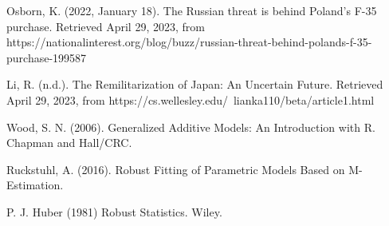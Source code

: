 \documentclass[11pt,regno]{amsart}
\theoremstyle{plain}
\numberwithin{equation}{section}
\begin{document}
\begin{thebibliography}{9}
Osborn, K. (2022, January 18). The Russian threat is behind Poland's F-35 purchase. Retrieved April 29, 2023, from https://nationalinterest.org/blog/buzz/russian-threat-behind-polands-f-35-purchase-199587

Li, R. (n.d.). The Remilitarization of Japan: An Uncertain Future. Retrieved April 29, 2023, from https://cs.wellesley.edu/~lianka110/beta/article1.html

Wood, S. N. (2006). Generalized Additive Models: An Introduction with R. Chapman and Hall/CRC.

Ruckstuhl, A. (2016). Robust Fitting of Parametric Models Based on M-Estimation.

P. J. Huber (1981) Robust Statistics. Wiley.

\end{thebibliography}
\endgroup

\

\

\
\end{document}
